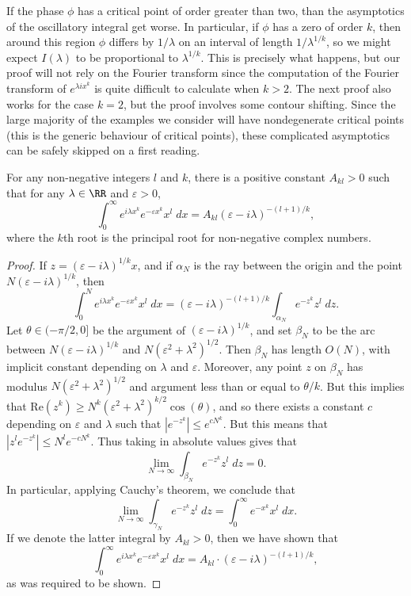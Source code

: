 If the phase $\phi$ has a critical point of order greater than two, than the asymptotics of the oscillatory integral get worse. In particular, if $\phi$ has a zero of order $k$, then around this region $\phi$ differs by $1/\lambda$ on an interval of length $1/\lambda^{1/k}$, so we might expect $I(\lambda)$ to be proportional to $\lambda^{1/k}$. This is precisely what happens, but our proof will not rely on the Fourier transform since the computation of the Fourier transform of $e^{\lambda ix^k}$ is quite difficult to calculate when $k > 2$. The next proof also works for the case $k = 2$, but the proof involves some contour shifting. Since the large majority of the examples we consider will have nondegenerate critical points (this is the generic behaviour of critical points), these complicated asymptotics can be safely skipped on a first reading.

\begin{lemma}
  For any non-negative integers $l$ and $k$, there is a positive constant $A_{kl} > 0$ such that for any $\lambda \in \RR$ and $\varepsilon > 0$,
  \[ \int_0^\infty e^{i \lambda x^k} e^{-\varepsilon x^k} x^l\; dx = A_{kl} (\varepsilon - i \lambda)^{-(l+1)/k}, \]
  where the $k$th root is the principal root for non-negative complex numbers.
\end{lemma}
\begin{proof}
  If $z = (\varepsilon - i \lambda)^{1/k} x$, and if $\alpha_N$ is the ray between the origin and the point $N (\varepsilon - i \lambda)^{1/k}$, then
  \[ \int_0^N e^{i \lambda x^k} e^{- \varepsilon x^k} x^l\; dx = (\varepsilon - i \lambda)^{-(l+1)/k} \int_{\alpha_N} e^{-z^k} z^l\; dz. \]
  Let $\theta \in (-\pi/2,0]$ be the argument of $(\varepsilon - i \lambda)^{1/k}$, and set $\beta_N$ to be the arc between $N ( \varepsilon - i \lambda)^{1/k}$ and $N (\varepsilon^2 + \lambda^2)^{1/2}$. Then $\beta_N$ has length $O(N)$, with implicit constant depending on $\lambda$ and $\varepsilon$. Moreover, any point $z$ on $\beta_N$ has modulus $N (\varepsilon^2 + \lambda^2)^{1/2}$ and argument less than or equal to $\theta / k$. But this implies that $\text{Re}(z^k) \geq N^k (\varepsilon^2 + \lambda^2)^{k/2} \cos(\theta)$, and so there exists a constant $c$ depending on $\varepsilon$ and $\lambda$ such that $|e^{-z^k}| \leq e^{c N^k}$. But this means that $|z^l e^{-z^k}| \leq N^l e^{-cN^k}$. Thus taking in absolute values gives that
  \[ \lim_{N \to \infty} \int_{\beta_N} e^{-z^k} z^l\; dz = 0. \]
  In particular, applying Cauchy's theorem, we conclude that
  \[ \lim_{N \to \infty} \int_{\gamma_N} e^{-z^k} z^l\; dz = \int_0^\infty e^{-x^k} x^l\; dx. \]
  If we denote the latter integral by $A_{kl} > 0$, then we have shown that
  \[ \int_0^\infty e^{i \lambda x^k} e^{-\varepsilon x^k} x^l\; dx = A_{kl} \cdot (\varepsilon - i \lambda)^{-(l+1)/k}, \]
  as was required to be shown.
\end{proof}


